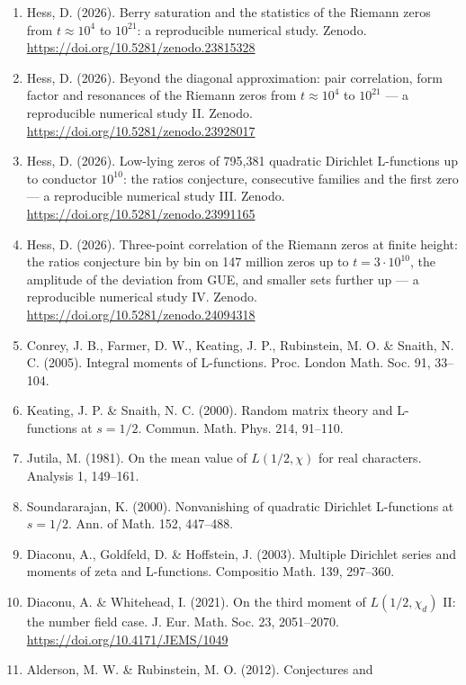 \documentclass[
  10pt,
]{article}
\providecommand{\tightlist}{%
  \setlength{\itemsep}{0pt}\setlength{\parskip}{0pt}}
\begin{document}
\begin{enumerate}
\def\labelenumi{\arabic{enumi}.}
\tightlist
\item
  Hess, D. (2026). Berry saturation and the statistics of the Riemann
  zeros from \(t \approx 10^4\) to \(10^{21}\): a reproducible numerical
  study. Zenodo. \url{https://doi.org/10.5281/zenodo.23815328}
\item
  Hess, D. (2026). Beyond the diagonal approximation: pair correlation,
  form factor and resonances of the Riemann zeros from
  \(t \approx 10^4\) to \(10^{21}\) --- a reproducible numerical study
  II. Zenodo. \url{https://doi.org/10.5281/zenodo.23928017}
\item
  Hess, D. (2026). Low-lying zeros of 795,381 quadratic Dirichlet
  L-functions up to conductor \(10^{10}\): the ratios conjecture,
  consecutive families and the first zero --- a reproducible numerical
  study III. Zenodo. \url{https://doi.org/10.5281/zenodo.23991165}
\item
  Hess, D. (2026). Three-point correlation of the Riemann zeros at
  finite height: the ratios conjecture bin by bin on 147 million zeros
  up to \(t = 3\cdot10^{10}\), the amplitude of the deviation from GUE,
  and smaller sets further up --- a reproducible numerical study IV.
  Zenodo. \url{https://doi.org/10.5281/zenodo.24094318}
\item
  Conrey, J. B., Farmer, D. W., Keating, J. P., Rubinstein, M. O. \&
  Snaith, N. C. (2005). Integral moments of L-functions. Proc. London
  Math. Soc. 91, 33--104.
\item
  Keating, J. P. \& Snaith, N. C. (2000). Random matrix theory and
  L-functions at \(s = 1/2\). Commun. Math. Phys. 214, 91--110.
\item
  Jutila, M. (1981). On the mean value of \(L(1/2, \chi)\) for real
  characters. Analysis 1, 149--161.
\item
  Soundararajan, K. (2000). Nonvanishing of quadratic Dirichlet
  L-functions at \(s = 1/2\). Ann. of Math. 152, 447--488.
\item
  Diaconu, A., Goldfeld, D. \& Hoffstein, J. (2003). Multiple Dirichlet
  series and moments of zeta and L-functions. Compositio Math. 139,
  297--360.
\item
  Diaconu, A. \& Whitehead, I. (2021). On the third moment of
  \(L(1/2, \chi_d)\) II: the number field case. J. Eur. Math. Soc. 23,
  2051--2070. \url{https://doi.org/10.4171/JEMS/1049}
\item
  Alderson, M. W. \& Rubinstein, M. O. (2012). Conjectures and

\end{enumerate}
\end{document}
